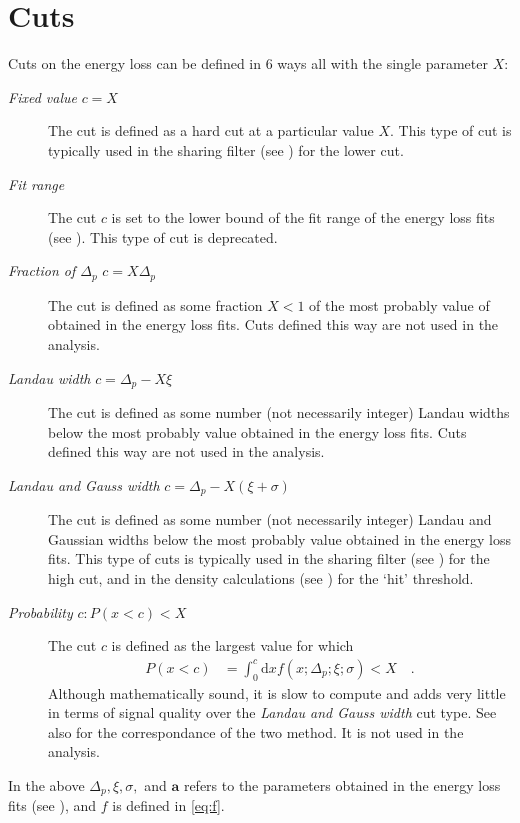 \section{Cuts}
\label{sec:cuts}


Cuts on the energy loss can be defined in 6 ways all with the single
parameter $X$:
\begin{description}
\item[\emph{Fixed value} $c=X$]
  The cut is defined as a hard cut at a particular value $X$.  This
  type of cut is typically used in the sharing filter (see
  ) for the lower cut.
\item[\emph{Fit range}]
  The cut $c$ is set to the lower bound of the fit range of the energy
  loss fits (see ).  This type of cut is deprecated.
\item[\emph{Fraction of $\Delta_p$} $c=X\Delta_p$] The cut is defined
  as some fraction $X<1$ of the most probably value of obtained in
  the energy loss fits.  Cuts defined this way are not used in the
  analysis. 
\item[\emph{Landau width} $c=\Delta_p-X\xi$] The cut is defined as
  some number (not necessarily integer) Landau widths below the most
  probably value obtained in the energy loss fits. Cuts defined this
  way are not used in the analysis. 
\item[\emph{Landau and Gauss width} $c=\Delta_p - X(\xi+\sigma)$] The
  cut is defined as some number (not necessarily integer) Landau and
  Gaussian widths below the most probably value obtained in the energy
  loss fits. This type of cuts is typically used in the sharing filter
  (see ) for the high cut, and in the
  density calculations (see ) for
  the `hit' threshold.
\item[\emph{Probability} $c:P(x<c)<X$] The cut $c$ is defined as
  the largest value for which 
  \begin{align*}
    P(x<c) &= \int_0^c\text{d}x f(x;\Delta_p;\xi;\sigma) < X\quad.
  \end{align*}
  Although mathematically sound, it is slow to compute and adds very
  little in terms of signal quality over the \emph{Landau and Gauss
    width}  cut type.  See also  for the
  correspondance of the two method. It is not used in the analysis.
\end{description}
In the above $\Delta_p,\xi,\sigma,$ and $\mathbf{a}$ refers to the
parameters obtained in the energy loss fits (see ),
and $f$ is defined in \eqref{eq:f}.

